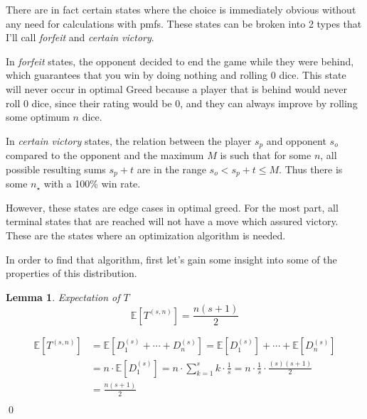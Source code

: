 \documentclass[a4paper]{article}
\newtheorem{lemma}{Lemma}
\renewenvironment{proof}{{\bfseries Proof}}{\qed}
\begin{document}
There are in fact certain states where the choice is immediately obvious without any need for calculations with pmfs. These states can be broken into 2 types that I'll call \textit{forfeit} and \textit{certain victory}. 

In \textit{forfeit} states, the opponent decided to end the game while they were behind, which guarantees that you win by doing nothing and rolling 0 dice. This state will never occur in optimal Greed because a player that is behind would never roll 0 dice, since their rating would be 0, and they can always improve by rolling some optimum $n$ dice. 

In \textit{certain victory} states, the relation between the player $s_p$ and opponent $s_o$ compared to the opponent and the maximum $M$ is such that for some $n$, all possible resulting sums $s_p + t$ are in the range $s_o < s_p + t  \leq M$. Thus there is some $n_{\star}$ with a 100\% win rate.

However, these states are edge cases in optimal greed. For the most part, all terminal states that are reached will not have a move which assured victory. These are the states where an optimization algorithm is needed.

In order to find that algorithm, first let's gain some insight into some of the properties of this distribution.


\begin{lemma}{Expectation of $T$}
    $$ \mathbb{E}[T^{(s, n)}] = \frac{n(s+1)}{2} $$
\end{lemma}
%
\begin{proof}
    \begin{align*}
        \mathbb{E}[T^{(s, n)}] &= \mathbb{E}[D_{1}^{(s)} + \cdots + D_{n}^{(s)}] = \mathbb{E}[D_{1}^{(s)}] + \cdots + \mathbb{E}[D_{n}^{(s)}] \\
        &= n \cdot \mathbb{E}[D_{1}^{(s)}] = n \cdot \sum_{k=1}^{s} k \cdot \frac{1}{s} = n \cdot \frac{1}{s} \cdot \frac{(s)(s+1)}{2} \\
        &= \frac{n(s+1)}{2} \\
    \end{align*}
\end{proof}

\end{document}
